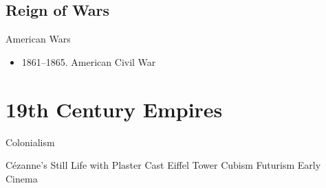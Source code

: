 

\subsection{Reign of Wars}
\begin{frame}{American Wars}
	\begin{itemize}
		\item<16->1861--1865. American Civil War
	\end{itemize}
\end{frame}

\section{19th Century Empires}
\begin{frame}{Colonialism}

\end{frame}

Cézanne's Still Life with Plaster Cast
Eiffel Tower
Cubism
Futurism
Early Cinema